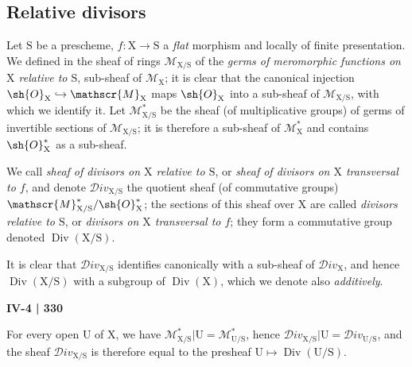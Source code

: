 \begin{env}[21.14.4bis]
\end{env}

\subsection{Relative divisors}
\label{subsection:IV.21.15}
\label{IV.21.15}

\begin{env}[21.15.1]
\label{IV.21.15.1}
Let $\mathrm{S}$ be a prescheme, $f:\mathrm{X}\to\mathrm{S}$ a \emph{flat} morphism and locally of finite presentation.
We defined in  the sheaf of rings $\mathscr{M}_{\mathrm{X}/\mathrm{S}}$ of the \emph{germs of meromorphic functions on $\mathrm{X}$ relative to $\mathrm{S}$}, sub-sheaf of $\mathscr{M}_{\mathrm{X}}$; it is clear that the canonical injection $\sh{O}_{\mathrm{X}}\hookrightarrow\mathscr{M}_{\mathrm{X}}$  maps $\sh{O}_{\mathrm{X}}$ into a sub-sheaf of $\mathscr{M}_{\mathrm{X}/\mathrm{S}}$, with which we identify it.
Let $\mathscr{M}_{\mathrm{X}/\mathrm{S}}^*$ be the sheaf (of multiplicative groups) of germs of invertible sections of $\mathscr{M}_{\mathrm{X}/\mathrm{S}}$; it is therefore a sub-sheaf of $\mathscr{M}_{\mathrm{X}}^*$ and contains $\sh{O}_{\mathrm{X}}^*$ as a sub-sheaf.
\end{env}

\begin{definition}[21.15.2]
\label{IV.21.15.2}
We call \emph{sheaf of divisors on $\mathrm{X}$ relative to $\mathrm{S}$}, or \emph{sheaf of divisors on $\mathrm{X}$ transversal to $f$}, and denote $\mathscr{D}iv_{\mathrm{X}/\mathrm{S}}$ the quotient sheaf (of commutative groups) $\mathscr{M}_{\mathrm{X}/\mathrm{S}}^*/\sh{O}_{\mathrm{X}}^*$; the sections of this sheaf over $\mathrm{X}$ are called \emph{divisors relative to $\mathrm{S}$}, or \emph{divisors on $\mathrm{X}$ transversal to $f$}; they form a commutative group denoted $\operatorname{Div}(\mathrm{X}/\mathrm{S})$.
\end{definition}

It is clear that $\mathscr{D}iv_{\mathrm{X}/\mathrm{S}}$ identifies canonically with a sub-sheaf of $\mathscr{D}iv_{\mathrm{X}}$, and hence $\operatorname{Div}(\mathrm{X}/\mathrm{S})$ with a subgroup of $\operatorname{Div}(\mathrm{X})$, which we denote also \emph{additively}.

\par\noindent\hfill{\footnotesize\textbf{IV-4 | 330}}\par
For every open $\mathrm{U}$ of $\mathrm{X}$, we have $\mathscr{M}_{\mathrm{X}/\mathrm{S}}^*|\mathrm{U}=\mathscr{M}_{\mathrm{U}/\mathrm{S}}^*$, hence $\mathscr{D}iv_{\mathrm{X}/\mathrm{S}}|\mathrm{U}=\mathscr{D}iv_{\mathrm{U}/\mathrm{S}}$, and the sheaf $\mathscr{D}iv_{\mathrm{X}/\mathrm{S}}$ is therefore equal to the presheaf $\mathrm{U}\mapsto\operatorname{Div}(\mathrm{U}/\mathrm{S})$.

